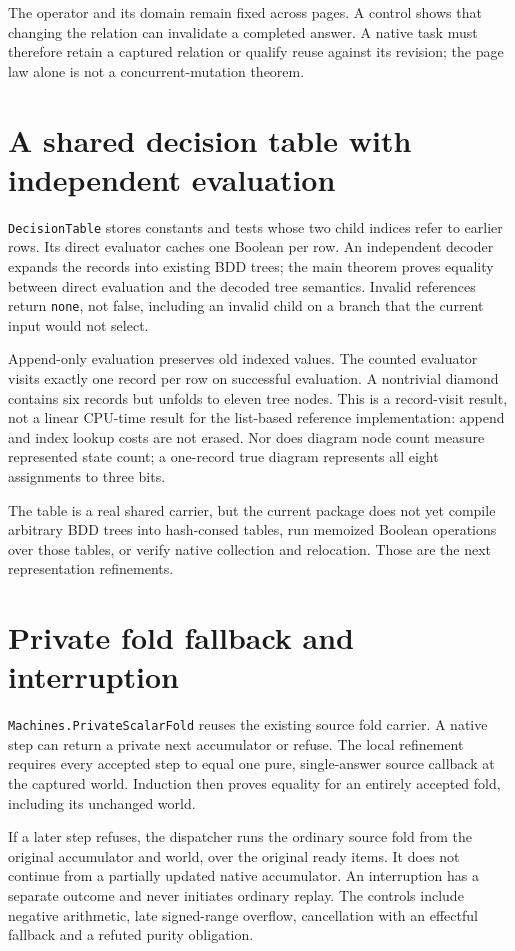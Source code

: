 \documentclass[11pt,a4paper]{article}
\newcommand{\code}[1]{\nolinkurl{#1}}
\begin{document}
The operator and its domain remain fixed across pages. A control shows that
changing the relation can invalidate a completed answer. A native task must
therefore retain a captured relation or qualify reuse against its revision;
the page law alone is not a concurrent-mutation theorem.

\section{A shared decision table with independent evaluation}

\code{DecisionTable} stores constants and tests whose two child indices refer
to earlier rows. Its direct evaluator caches one Boolean per row. An
independent decoder expands the records into existing BDD trees; the main
theorem proves equality between direct evaluation and the decoded tree
semantics. Invalid references return \code{none}, not false, including an
invalid child on a branch that the current input would not select.

Append-only evaluation preserves old indexed values. The counted evaluator
visits exactly one record per row on successful evaluation. A nontrivial
diamond contains six records but unfolds to eleven tree nodes. This is a
record-visit result, not a linear CPU-time result for the list-based reference
implementation: append and index lookup costs are not erased. Nor does
diagram node count measure represented state count; a one-record true
diagram represents all eight assignments to three bits.

The table is a real shared carrier, but the current package does not yet
compile arbitrary BDD trees into hash-consed tables, run memoized Boolean
operations over those tables, or verify native collection and relocation.
Those are the next representation refinements.

\section{Private fold fallback and interruption}

\code{Machines.PrivateScalarFold} reuses the existing source fold carrier.
A native step can return a private next accumulator or refuse. The local
refinement requires every accepted step to equal one pure, single-answer
source callback at the captured world. Induction then proves equality for
an entirely accepted fold, including its unchanged world.

If a later step refuses, the dispatcher runs the ordinary source fold from
the original accumulator and world, over the original ready items. It does
not continue from a partially updated native accumulator. An interruption
has a separate outcome and never initiates ordinary replay. The controls
include negative arithmetic, late signed-range overflow, cancellation with
an effectful fallback and a refuted purity obligation.
\end{document}
